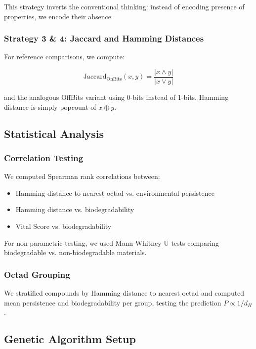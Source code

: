 \documentclass[11pt,letterpaper]{article}
\begin{document}
This strategy inverts the conventional thinking: instead of encoding presence of properties, we encode their absence.

\subsubsection{Strategy 3 \& 4: Jaccard and Hamming Distances}

For reference comparisons, we compute:

\begin{equation}
\text{Jaccard}_{\text{OnBits}}(x, y) = \frac{|x \land y|}{|x \lor y|}
\end{equation}

and the analogous OffBits variant using 0-bits instead of 1-bits. Hamming distance is simply popcount of $x \oplus y$.

\subsection{Statistical Analysis}

\subsubsection{Correlation Testing}

We computed Spearman rank correlations between:
\begin{itemize}
    \item Hamming distance to nearest octad vs. environmental persistence
    \item Hamming distance vs. biodegradability
    \item Vital Score vs. biodegradability
\end{itemize}

For non-parametric testing, we used Mann-Whitney U tests comparing biodegradable vs. non-biodegradable materials.

\subsubsection{Octad Grouping}

We stratified compounds by Hamming distance to nearest octad and computed mean persistence and biodegradability per group, testing the prediction $P \propto 1/d_H$.

\subsection{Genetic Algorithm Setup}
\end{document}
